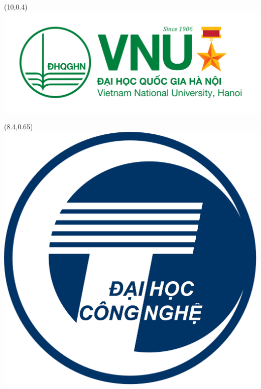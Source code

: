 


\begin{textblock}{1}(10,0.4)
	\includegraphics[scale=0.3]{frontmatter/media/vnu.png}	
\end{textblock}

\begin{textblock}{1}(8.4,0.65)
	\includegraphics[scale=0.035]{frontmatter/media/uet.png}	
\end{textblock}


